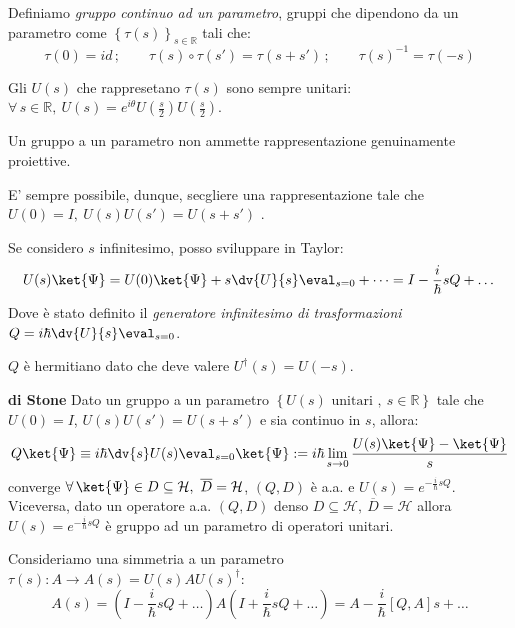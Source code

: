 \begin{definition}
    Definiamo \textit{gruppo continuo ad un parametro}, gruppi che dipendono da un parametro come \(\left\{ \tau(s) \right\}_{s \in \mathbb{R}}\) tali che:
    \[
        \tau(0)= id\,;\qquad \tau(s)\circ \tau(s') = \tau(s+s')\,;\qquad\tau(s)^{-1} = \tau(-s )
    \]
\end{definition}

Gli \(U(s)\) che rappresetano \(\tau(s )\) sono sempre unitari: \(\forall \, s \in \mathbb{R}, \ U(s) = e^{i\theta}U(\frac{s}{2})U(\frac{s}{2})\).


\begin{theorem}
    Un gruppo a un parametro non ammette rappresentazione genuinamente proiettive.
\end{theorem}
E' sempre possibile, dunque, secgliere una rappresentazione tale che \(U(0)= I, \  U(s)U(s')= U(s+s')\) .

Se considero \(s \) infinitesimo, posso sviluppare in Taylor:
\[
    U(s )\ket{\Psi}= U(0)\ket{\Psi}+ s \dv{U}{s} \eval_{s = 0} + \dots = I - \frac{i}{\hbar}s Q    + \dots
\]
Dove è stato definito il \textit{generatore infinitesimo di trasformazioni} \(Q = i\hbar \dv{U}{s}\eval_{s =0}\).
\begin{remark}
    \(Q\) è hermitiano dato che deve valere \(U^\dagger(s)= U(-s)\).
\end{remark}


\begin{theorem}\label{theo: Stone}
    {\normalfont\textbf{di Stone}} Dato un gruppo a un parametro \(\left\{ U(s) \text{ unitari } , \ s \in \mathbb{R}\right\}\) tale che \(U(0)= I\), \(U(s )U (s') = U(s+s')\) e sia continuo in \(s \), allora:
    \[
        Q\ket{\Psi} \equiv i\hbar \dv{s}U(s )\eval_{s=0}\ket{\Psi}    := i\hbar\lim_{s \to 0} \frac{U(s)\ket{\Psi}-\ket{\Psi}}{s}
    \]
    converge \(\forall\,\ket{\Psi}\in  D \subseteq \mathcal{H}, \ \overline{D}= \mathcal{H}\), \((Q,D)\) è a.a. e \(U(s )= e^{-\frac{i}{\hbar}sQ}\).\\
    Viceversa, dato un operatore a.a. \((Q, D)\) denso \(D \subseteq\mathcal{H}, \ \overline{D}= \mathcal{H}\) allora \(U(s)= e^{-\frac{i}{\hbar}sQ}\) è gruppo ad un parametro di operatori unitari.
\end{theorem}

Consideriamo una simmetria a un parametro \(\tau(s ): A \to A(s )= U(s )A U(s )^\dagger \):
\[
    A(s) = 
    \left( I - \frac{i}{\hbar}sQ + \dots \right)
    A
    \left( I + \frac{i}{\hbar}sQ + \dots \right)
    = A - \frac{i}{\hbar}\left[ Q, A \right]s + \dots
\]

